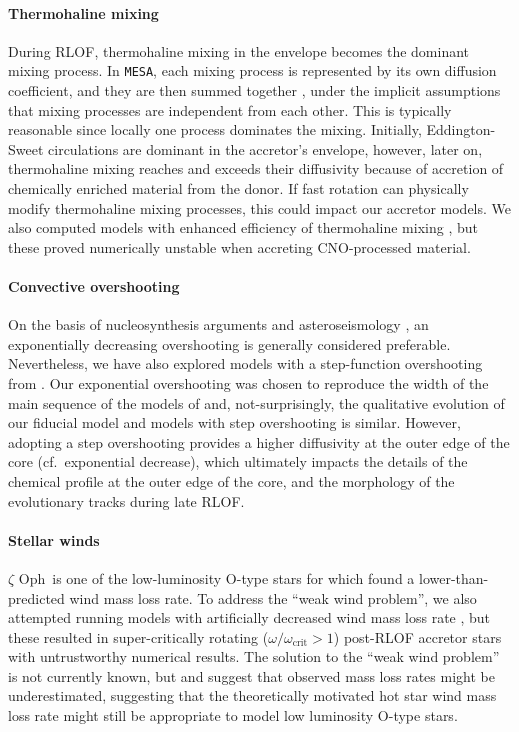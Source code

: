 \documentclass[twocolumn,twocolappendix,trackchanges]{aastex63}
\newcommand{\code}[1]{\texttt{#1}}
\newcommand{\MESA}{\code{MESA}}
\newcommand{\zoph}{$\zeta$ Oph}
\begin{document}
\paragraph{Thermohaline mixing}
During RLOF, thermohaline mixing in the envelope becomes the dominant
mixing process. In \MESA, each mixing process is represented by its
own diffusion coefficient, and they are then summed together
\citep{paxton:11}, under the implicit assumptions that mixing
processes are independent from each other. This is typically
reasonable since locally one process dominates the mixing.  Initially,
Eddington-Sweet circulations are dominant in the accretor's envelope,
however, later on, thermohaline mixing reaches and exceeds their
diffusivity because of accretion of
chemically enriched material from the donor. If fast rotation can
physically modify thermohaline mixing processes, this could impact our
accretor models. We also computed models with enhanced efficiency of
thermohaline mixing \citep[100 times higher,
][]{schootemeijer:19}, but these proved numerically unstable when
accreting CNO-processed material.

\paragraph{Convective overshooting}
On the basis of nucleosynthesis arguments \citep[e.g.,][]{herwig:00}
and asteroseismology \citep[e.g.,][]{moravveji:16}, an exponentially
decreasing overshooting is generally considered
preferable. Nevertheless, we have also explored models with a
step-function overshooting from \cite{brott:11}. Our
exponential overshooting \citep{claret:17} was chosen to reproduce the width of the
main sequence of the models of \cite{brott:11} and, not-surprisingly,
the qualitative evolution of our fiducial model and models with step
overshooting is similar. However, adopting a step overshooting
provides a higher diffusivity at the outer edge of the core (cf.\
exponential decrease), which ultimately impacts the details of the
chemical profile at the outer edge of the core, and the morphology of
the evolutionary tracks during late RLOF.

\paragraph{Stellar winds}
\zoph\ is one of the low-luminosity O-type stars for which
\cite{marcolino:09} found a lower-than-predicted wind mass loss rate.
To address the ``weak wind problem'', we also attempted running models
with artificially decreased wind mass loss rate
\citep[e.g.,][]{renzo:17}, but these resulted in super-critically
rotating ($\omega/\omega_\mathrm{crit}>1$) post-RLOF accretor stars
with untrustworthy numerical results. The solution to the ``weak wind
problem'' is not currently known, but \cite{lucy:12} and
\cite{lagae:21} suggest that observed mass loss rates might be
underestimated, suggesting that the theoretically motivated hot star
wind mass loss rate might still be appropriate to model low luminosity
O-type stars.
\end{document}
